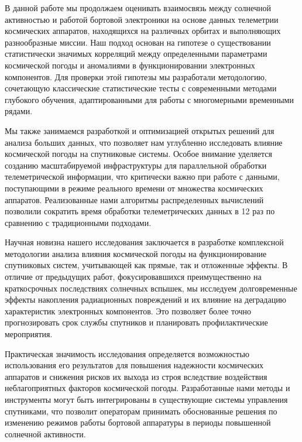 В данной работе мы продолжаем оценивать взаимосвязь между солнечной активностью
и работой бортовой электроники на основе данных телеметрии космических
аппаратов, находящихся на различных орбитах и выполняющих разнообразные миссии.
Наш подход основан на гипотезе о существовании статистически значимых корреляций
между определенными параметрами космической погоды и аномалиями в
функционировании электронных компонентов. Для проверки этой гипотезы мы
разработали методологию, сочетающую классические статистические тесты с
современными методами глубокого обучения, адаптированными для работы с
многомерными временными рядами.

Мы также занимаемся разработкой и оптимизацией открытых решений для анализа
больших данных, что позволяет нам углубленно исследовать влияние космической
погоды на спутниковые системы. Особое внимание уделяется созданию масштабируемой
инфраструктуры для параллельной обработки телеметрической информации, что
критически важно при работе с данными, поступающими в режиме реального времени
от множества космических аппаратов. Реализованные нами алгоритмы распределенных
вычислений позволили сократить время обработки телеметрических данных в 12 раз
по сравнению с традиционными подходами.

Научная новизна нашего исследования заключается в разработке комплексной
методологии анализа влияния космической погоды на функционирование спутниковых
систем, учитывающей как прямые, так и отложенные эффекты. В отличие от
предыдущих работ, фокусировавшихся преимущественно на краткосрочных последствиях
солнечных вспышек, мы исследуем долговременные эффекты накопления радиационных
повреждений и их влияние на деградацию характеристик электронных компонентов.
Это позволяет более точно прогнозировать срок службы спутников и планировать
профилактические мероприятия.

Практическая значимость исследования определяется возможностью использования его
результатов для повышения надежности космических аппаратов и снижения рисков их
выхода из строя вследствие воздействия неблагоприятных факторов космической
погоды. Разработанные нами методы и инструменты могут быть интегрированы в
существующие системы управления спутниками, что позволит операторам принимать
обоснованные решения по изменению режимов работы бортовой аппаратуры в периоды
повышенной солнечной активности.
